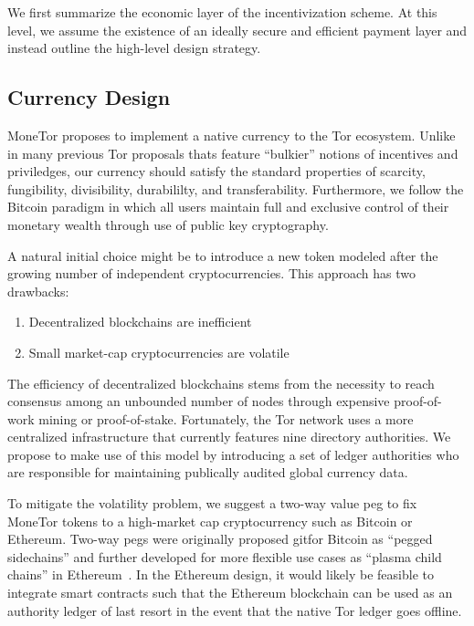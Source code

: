 We first summarize the economic layer of the incentivization scheme. At this
level, we assume the existence of an ideally secure and efficient payment layer
and instead outline the high-level design strategy.

\subsection{Currency Design}

MoneTor proposes to implement a native currency to the Tor ecosystem. Unlike in
many previous Tor proposals thats feature ``bulkier'' notions of incentives and
priviledges, our currency should satisfy the standard properties of scarcity,
fungibility, divisibility, durabililty, and transferability. Furthermore, we
follow the Bitcoin paradigm in which all users maintain full and exclusive
control of their monetary wealth through use of public key cryptography.

A natural initial choice might be to introduce a new token modeled after the
growing number of independent cryptocurrencies. This approach has two drawbacks:

\begin{enumerate}
\item Decentralized blockchains are inefficient
\item Small market-cap cryptocurrencies are volatile
\end{enumerate}

The efficiency of decentralized blockchains stems from the necessity to reach
consensus among an unbounded number of nodes through expensive proof-of-work
mining or proof-of-stake. Fortunately, the Tor network uses a more centralized
infrastructure that currently features nine directory authorities. We propose to
make use of this model by introducing a set of ledger authorities who are
responsible for maintaining publically audited global currency data.

To mitigate the volatility problem, we suggest a two-way value peg to fix
MoneTor tokens to a high-market cap cryptocurrency such as Bitcoin or
Ethereum. Two-way pegs were originally proposed gitfor Bitcoin as ``pegged
sidechains'' and further developed for more flexible use cases as ``plasma child
chains'' in Ethereum~\cite{back2014enabling, poon2017plasma}. In the
Ethereum design, it would likely be feasible to integrate smart contracts such
that the Ethereum blockchain can be used as an authority ledger of last resort
in the event that the native Tor ledger goes offline.

